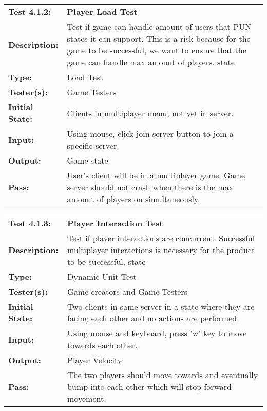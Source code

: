 \documentclass[12pt, titlepage]{article}
\begin{document}
\begin{mdframed}[linewidth=1pt]
\begin{tabularx}{\textwidth}{@{}p{3cm}X@{}}
{\bf Test 4.1.2:} & {\bf Player Load Test}\\[\baselineskip]
{\bf Description:} & Test if game can handle amount of users that PUN states it can support. This is a risk because for the game to be successful, we want to ensure that the game can handle max amount of players. state\\[0.5\baselineskip]
{\bf Type:} & Load Test\\[0.5\baselineskip]
{\bf Tester(s):} & Game Testers\\[0.5\baselineskip]
{\bf Initial State:} & Clients in multiplayer menu, not yet in server.\\[0.5\baselineskip]
{\bf Input:} & Using mouse, click join server button to join a specific server.\\[0.5\baselineskip]
{\bf Output:} & Game state\\[0.5\baselineskip]
{\bf Pass:} & User's client will be in a multiplayer game. Game server should not crash when there is the max amount of players on simultaneously.
\end{tabularx}
\end{mdframed}

\begin{mdframed}[linewidth=1pt]
\begin{tabularx}{\textwidth}{@{}p{3cm}X@{}}
{\bf Test 4.1.3:} & {\bf Player Interaction Test}\\[\baselineskip]
{\bf Description:} & Test if player interactions are concurrent. Successful multiplayer interactions is necessary for the product to be successful. state\\[0.5\baselineskip]
{\bf Type:} & Dynamic Unit Test\\[0.5\baselineskip]
{\bf Tester(s):} & Game creators and Game Testers\\[0.5\baselineskip]
{\bf Initial State:} & Two clients in same server in a state where they are facing each other and no actions are performed.\\[0.5\baselineskip]
{\bf Input:} & Using mouse and keyboard, press 'w' key to move towards each other.\\[0.5\baselineskip]
{\bf Output:} & Player Velocity\\[0.5\baselineskip]
{\bf Pass:} & The two players should move towards and eventually bump into each other which will stop forward movement.
\end{tabularx}
\end{mdframed}
\end{document}
